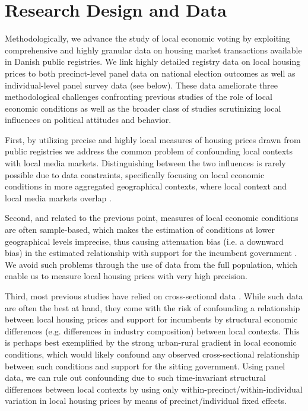 \documentclass[12pt,a4paper]{article}
\begin{document}
	\section{Research Design and Data}\label{resdesign}
	Methodologically, we advance the study of local economic voting by exploiting comprehensive and highly granular data on housing market transactions available in Danish public registries. We link highly detailed registry data on local housing prices to both precinct-level panel data on national election outcomes as well as individual-level panel survey data (see below). These data ameliorate three methodological challenges confronting previous studies of the role of local economic conditions as well as the broader class of studies scrutinizing local influences on political attitudes and behavior.
	
	First, by utilizing precise and highly local measures of housing prices drawn from public registries we address the common problem of confounding local contexts with local media markets. Distinguishing between the two influences is rarely possible due to data constraints, specifically focusing on local economic conditions in more aggregated geographical contexts, where local context and local media markets overlap \citep[][]{bisgaard2016reconsidering}.  
	
	Second, and related to the previous point, measures of local economic conditions are often sample-based, which makes the estimation of conditions at lower geographical levels imprecise, thus causing attenuation bias (i.e. a downward bias) in the estimated relationship with support for the incumbent government \citep[][]{healy2017presidential}. We avoid such problems through the use of data from the full population, which enable us to measure local housing prices with very high precision.
	
	Third, most previous studies have relied on cross-sectional data \citep[e.g.,][]{reeves2012ecologies, ansolabehere2014mecro, books1999contextual}. While such data are often the best at hand, they come with the risk of confounding a relationship between local housing prices and support for incumbents by structural economic differences (e.g. differences in industry composition) between local contexts. This is perhaps best exemplified by the strong urban-rural gradient in local economic conditions, which would likely confound any observed cross-sectional relationship between such conditions and support for the sitting government. Using panel data, we can rule out confounding due to such time-invariant structural differences between local contexts by using only within-precinct/within-individual variation in local housing prices by means of precinct/individual fixed effects.
	
\end{document}
